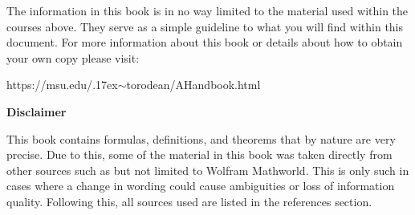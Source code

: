 The information in this book is in no way limited to the material used within the courses above. They serve as a simple guideline to what you will find within this document. For more information about this book or details about how to obtain your own copy please visit:
\begin{center}
	https://msu.edu/{\raise.17ex\hbox{$\scriptstyle\sim$}}torodean/AHandbook.html
\end{center}
\begin{center}
	\textbf{Disclaimer}
\end{center}

This book contains formulas, definitions, and theorems that by nature are very precise. Due to this, some of the material in this book was taken directly from other sources such as but not limited to Wolfram Mathworld. This is only such in cases where a change in wording could cause ambiguities or loss of information quality.  Following this, all sources used are listed in the references section.